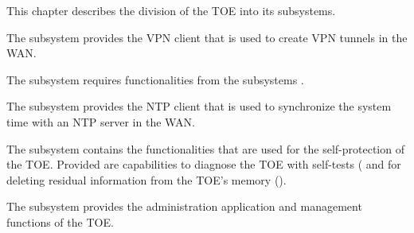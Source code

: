 
This chapter describes the division of the TOE into its subsystems.




The subsystem  provides the VPN client that is used to create VPN tunnels in the WAN.




The subsystem  requires functionalities from the subsystems
.





The subsystem  provides the NTP client that is used to
synchronize the system time with an NTP server in the WAN.






The subsystem  contains the functionalities that are used
for the self-protection of the TOE. Provided are capabilities to diagnose the
TOE with self-tests ( and for deleting
residual information from the TOE's memory ().






The subsystem  provides the administration application and
management functions of the TOE.

